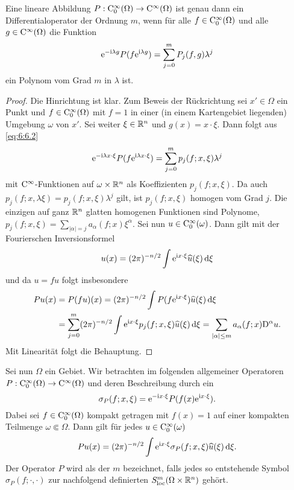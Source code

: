 \begin{lem}
Eine  lineare Abbildung   $P:\mathrm C_0^\infty(\Omega)\to\mathrm C^\infty(\Omega)$ ist genau dann ein Differentialoperator der Ordnung $m$, wenn für alle $f\in\mathrm C_0^\infty(\Omega)$ und alle $g\in\mathrm C^\infty(\Omega)$ die Funktion 
\begin{equation}\label{eq:6:6.2}
\mathrm e^{-\mathrm i\lambda g} P(f\mathrm e^{\mathrm i\lambda g}) = \sum_{j=0}^m P_j(f,g) \lambda^j
\end{equation}
ein Polynom vom Grad $m$ in $\lambda$ ist.
\end{lem}
\begin{proof}
Die Hinrichtung ist klar. Zum Beweis der Rückrichtung sei $x'\in\Omega$ ein Punkt und $f\in\mathrm C_0^\infty(\Omega)$ mit $f=1$  in einer (in einem Kartengebiet liegenden) Umgebung $\omega$ von $x'$. Sei weiter $\xi\in\mathbb R^n$ und $g(x) = x\cdot\xi$. Dann folgt aus \eqref{eq:6:6.2}
\begin{equation}
    \mathrm e^{-\mathrm i \lambda x\cdot\xi} P ( f\mathrm e^{\mathrm i \lambda x\cdot\xi}) = \sum_{j=0}^m p_j(f;x,\xi) \lambda^j
\end{equation}
mit $\mathrm C^\infty$-Funktionen auf $\omega\times\mathbb R^n$ als Koeffizienten $p_j(f;x,\xi)$. Da auch
$p_j(f;x,\lambda\xi)=p_j(f;x,\xi)\lambda^j$ gilt, ist $p_j(f;x,\xi)$ homogen vom Grad $j$. Die einzigen auf ganz $\mathbb R^n$ glatten homogenen Funktionen sind Polynome,
$p_j(f;x,\xi) = \sum_{|\alpha|=j} a_\alpha(f;x) \xi^\alpha$. Sei nun $u\in\mathrm C_0^\infty(\omega)$. Dann gilt mit der Fourierschen Inversionsformel
\begin{equation}
    u(x) = (2\pi)^{-n/2} \int \mathrm e^{\mathrm i x\cdot\xi} \widehat u(\xi)\,\mathrm d\xi
\end{equation}
und da $u=fu$ folgt insbesondere 
\begin{align}
    Pu(x) &= P(fu)(x) = (2\pi)^{-n/2} \int P(f \mathrm e^{\mathrm i x\cdot\xi}) \widehat u(\xi)\,\mathrm d\xi \notag \\&= \sum_{j=0}^m (2\pi)^{-n/2} \int \mathrm e^{\mathrm i x\cdot\xi} p_j(f;x,\xi) \widehat u(\xi)\,\mathrm d\xi
    = \sum_{|\alpha|\le m} a_\alpha(f;x)\mathrm D^\alpha u.
\end{align}
Mit Linearität folgt die Behauptung.
\end{proof}

Sei nun $\Omega$ ein Gebiet.
Wir betrachten im folgenden allgemeiner Operatoren $P : \mathrm C_0^\infty(\Omega) \to \mathrm C^\infty(\Omega)$ und deren Beschreibung durch ein 
\begin{equation}\label{eq:6:6.6}
    \sigma_P(f; x,\xi) = \mathrm e^{-\mathrm i x\cdot\xi} P( f(x) \mathrm e^{\mathrm i x\cdot\xi}).
\end{equation}  
Dabei sei $f\in\mathrm C_0^\infty(\Omega)$ kompakt getragen mit $f(x)=1$ auf einer kompakten Teilmenge $\omega\Subset\Omega$. 
Dann gilt für jedes $u\in\mathrm C_0^\infty(\omega)$ 
\begin{equation}
   P u (x) = (2\pi)^{-n/2} \int \mathrm e^{\mathrm i x\cdot\xi} \sigma_P(f; x,\xi) \widehat u(\xi) \,\mathrm d\xi.
\end{equation}
Der Operator $P$ wird als  der  $m$ bezeichnet, falls jedes so entstehende Symbol 
$\sigma_P(f;\cdot,\cdot)$ zur nachfolgend definierten  $S^m_{\rm loc}(\Omega\times\mathbb R^n)$ gehört.

